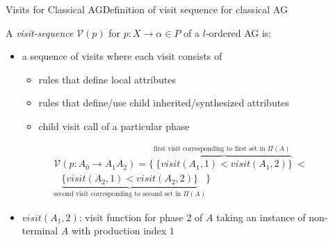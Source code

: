 

\begin{frame}{Visits for Classical AG}{Definition of visit sequence for classical AG}

A \emph{visit-sequence} $\mathscr{V}(p)$ for $p{:} X \rightarrow \alpha \in P$ of a $l$-ordered AG is:

\begin{itemize}
    \item a sequence of visits where each visit consists of
    \begin{itemize}
        \item rules that define local attributes
        \item rules that define/use child inherited/synthesized attributes 
        \item child visit call of a particular phase
    \end{itemize}
\end{itemize}


{
\scriptsize
\begin{equation}\label{eq:visit-for-production-aa}
\begin{gathered}
\mathscr{V}(p{:} A_0 \rightarrow A_1 A_2) = \Bigg\{               
   \overbrace{ \Big\{  \mathit{visit}(A_1, 1)  < \mathit{visit}(A_1, 2)	 \Big\}}^\text{first visit corresponding to first set in $\Pi(A)$ }  <  \\
   \underbrace{ \Big\{  \mathit{visit}(A_2, 1)  < \mathit{visit}(A_2, 2) \Big\}}_\text{second visit corresponding to second set in $\Pi(A)$}
\Bigg\}
\end{gathered}
\end{equation}
}

\begin{itemize}
    \item[] {\huge \bell}  $\mathit{visit}(A_1, 2)$: visit function for phase 2 of $A$ taking an instance of non-terminal $A$ with production index $1$
\end{itemize}
\end{frame}

